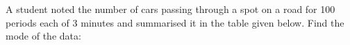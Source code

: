 \begin{flushleft}
A student noted the number of cars passing through a spot on a road for 100
periods each of 3 minutes and summarised it in the table given below. Find the mode
of the data:
\end{flushleft}

\begin{table}[ht!]
\centering

\end{table} 
